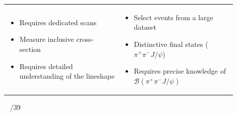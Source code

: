 \documentclass[landscape]{article}
\newenvironment{slide}[1][ ]{}{\mbox{ } \hfill \arabic{page}/39 \pagebreak}
\begin{document}
\begin{slide}
\begin{center}
\begin{tabular}{p{0.45\linewidth} p{0.45\linewidth}}
\begin{minipage}{\linewidth}
\vspace{0.5 cm}
\begin{itemize}

  \item Requires dedicated scans

  \item Measure inclusive cross-section

  \item Requires detailed understanding of the lineshape

\end{itemize}
\end{minipage} &
\begin{minipage}{\linewidth}

\vspace{0.5 cm}
\begin{itemize}

  \item Select events from a large dataset

  \item Distinctive final states ($\pi^+\pi^- J/\psi$)

  \item Requires precise knowledge of ${\mathcal B}(\pi^+\pi^- J/\psi)$

\end{itemize}
\end{minipage}

\end{tabular}
\end{center}

\vfill
\end{slide}

\end{document}
